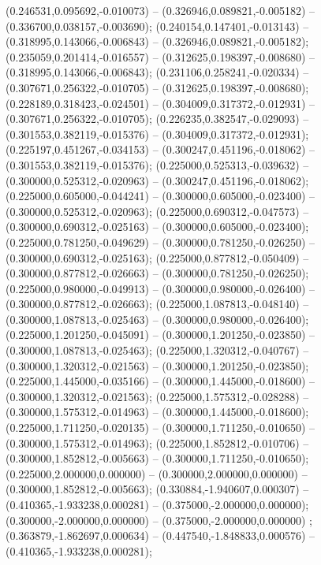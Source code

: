  (0.246531,0.095692,-0.010073) -- (0.326946,0.089821,-0.005182) -- (0.336700,0.038157,-0.003690);
 (0.240154,0.147401,-0.013143) -- (0.318995,0.143066,-0.006843) -- (0.326946,0.089821,-0.005182);
 (0.235059,0.201414,-0.016557) -- (0.312625,0.198397,-0.008680) -- (0.318995,0.143066,-0.006843);
 (0.231106,0.258241,-0.020334) -- (0.307671,0.256322,-0.010705) -- (0.312625,0.198397,-0.008680);
 (0.228189,0.318423,-0.024501) -- (0.304009,0.317372,-0.012931) -- (0.307671,0.256322,-0.010705);
 (0.226235,0.382547,-0.029093) -- (0.301553,0.382119,-0.015376) -- (0.304009,0.317372,-0.012931);
 (0.225197,0.451267,-0.034153) -- (0.300247,0.451196,-0.018062) -- (0.301553,0.382119,-0.015376);
 (0.225000,0.525313,-0.039632) -- (0.300000,0.525312,-0.020963) -- (0.300247,0.451196,-0.018062);
 (0.225000,0.605000,-0.044241) -- (0.300000,0.605000,-0.023400) -- (0.300000,0.525312,-0.020963);
 (0.225000,0.690312,-0.047573) -- (0.300000,0.690312,-0.025163) -- (0.300000,0.605000,-0.023400);
 (0.225000,0.781250,-0.049629) -- (0.300000,0.781250,-0.026250) -- (0.300000,0.690312,-0.025163);
 (0.225000,0.877812,-0.050409) -- (0.300000,0.877812,-0.026663) -- (0.300000,0.781250,-0.026250);
 (0.225000,0.980000,-0.049913) -- (0.300000,0.980000,-0.026400) -- (0.300000,0.877812,-0.026663);
 (0.225000,1.087813,-0.048140) -- (0.300000,1.087813,-0.025463) -- (0.300000,0.980000,-0.026400);
 (0.225000,1.201250,-0.045091) -- (0.300000,1.201250,-0.023850) -- (0.300000,1.087813,-0.025463);
 (0.225000,1.320312,-0.040767) -- (0.300000,1.320312,-0.021563) -- (0.300000,1.201250,-0.023850);
 (0.225000,1.445000,-0.035166) -- (0.300000,1.445000,-0.018600) -- (0.300000,1.320312,-0.021563);
 (0.225000,1.575312,-0.028288) -- (0.300000,1.575312,-0.014963) -- (0.300000,1.445000,-0.018600);
 (0.225000,1.711250,-0.020135) -- (0.300000,1.711250,-0.010650) -- (0.300000,1.575312,-0.014963);
 (0.225000,1.852812,-0.010706) -- (0.300000,1.852812,-0.005663) -- (0.300000,1.711250,-0.010650);
 (0.225000,2.000000,0.000000) -- (0.300000,2.000000,0.000000) -- (0.300000,1.852812,-0.005663);
 (0.330884,-1.940607,0.000307) -- (0.410365,-1.933238,0.000281) -- (0.375000,-2.000000,0.000000);
 (0.300000,-2.000000,0.000000) -- (0.375000,-2.000000,0.000000) ;
 (0.363879,-1.862697,0.000634) -- (0.447540,-1.848833,0.000576) -- (0.410365,-1.933238,0.000281);
